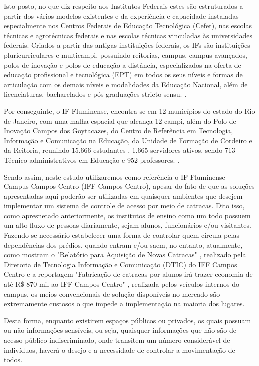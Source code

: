 Isto posto, no que diz respeito aos Institutos Federais estes são estruturados a partir dos vários modelos existentes e da experiência e capacidade instaladas especialmente nos Centros Federais de Educação Tecnológica (Cefet), nas escolas técnicas e agrotécnicas federais e nas escolas técnicas vinculadas às universidades federais. Criados a partir das antigas instituições federais, os IFs são instituições pluricurriculares e multicampi, possuindo reitorias, campus, campus avançados, polos de inovação e polos de educação a distância, especializados na oferta de educação profissional e tecnológica (EPT) em todos os seus níveis e formas de articulação com os demais níveis e modalidades da Educação Nacional, além de licenciaturas, bacharelados e pós-graduações stricto sensu. \cite{institutofederal}.



Por conseguinte, o IF Fluminense, encontra-se em 12 municípios do estado do Rio de Janeiro, com uma malha espacial que alcança 12 campi, além do Polo de Inovação Campos dos Goytacazes, do Centro de Referência em Tecnologia, Informação e Comunicação na Educação, da Unidade de Formação de Cordeiro e da Reitoria, reunindo 15.666 estudantes \cite{iffemnumeros}, 1.665 servidores ativos, sendo 713 Técnico-administrativos em Educação e 952 professores. \cite{iffluminense}. 


Sendo assim, neste estudo utilizaremos como referência o IF Fluminense - Campus Campos Centro (IFF Campos Centro), apesar do fato de que as soluções apresentadas aqui poderão ser utilizadas em quaisquer ambientes que desejem implementar um sistema de controle de acesso por meio de catracas. Dito isso, como apresnetado anteriormente, os institutos de ensino como um todo possuem um alto fluxo de pessoas
diariamente, sejam alunos, funcionários e/ou visitantes. Fazendo-se necessário
estabelecer uma forma de controlar quem circula pelas dependências dos prédios, quando
entram e/ou saem, no entanto, atualmente, como mostram o "Relatório para Aquisição de Novas Catracas" \cite{relatorio},  realizado pela Diretoria de
Tecnologia Informação e Comunicação (DTIC) do IFF Campos Centro e a reportagem "Fabricação de catracas por alunos irá trazer economia de até R\$ 870 mil ao IFF Campos Centro" \cite{reportagem}, realizada pelos veículos internos do campus,  os meios convencionais de solução disponíveis
no mercado são extremamente custosos o que impede a implementação na maioria dos lugares.



Desta forma, enquanto existirem espaços públicos ou privados, os quais possuam ou não
informações sensíveis, ou seja, quaisquer informações que não são de acesso público indiscriminado, onde transitem um número considerável de indivíduos, haverá o
desejo e a necessidade de controlar a movimentação de todos.

